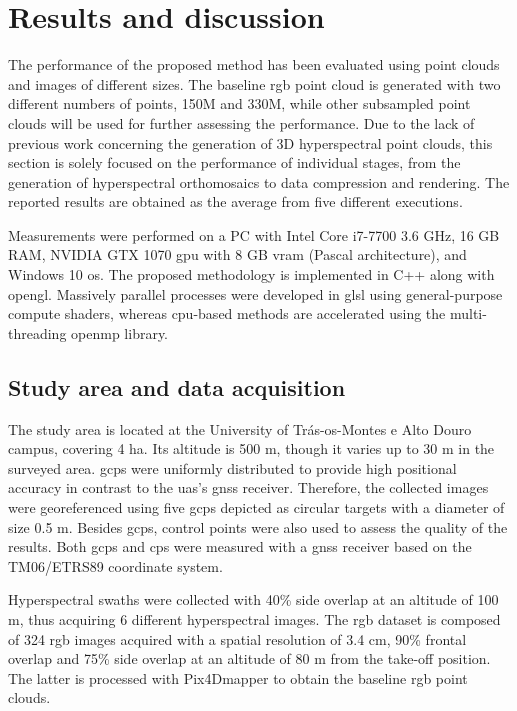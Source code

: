 \section{Results and discussion}

The performance of the proposed method has been evaluated using point clouds and images of different sizes. The baseline \acrshort{rgb} point cloud is generated with two different numbers of points, 150M and 330M, while other subsampled point clouds will be used for further assessing the performance. Due to the lack of previous work concerning the generation of 3D hyperspectral point clouds, this section is solely focused on the performance of individual stages, from the generation of hyperspectral orthomosaics to data compression and rendering. The reported results are obtained as the average from five different executions.

Measurements were performed on a PC with Intel Core i7-7700 3.6 GHz, 16 GB RAM, NVIDIA GTX 1070 \acrshort{gpu} with 8 GB \acrshort{vram} (Pascal architecture), and Windows 10 \acrshort{os}. The proposed methodology is implemented in C++ along with \acrshort{opengl}. Massively parallel processes were developed in \acrshort{glsl} using general-purpose compute shaders, whereas \acrshort{cpu}-based methods are accelerated using the multi-threading \acrshort{openmp} library.

\subsection{Study area and data acquisition}

The study area is located at the University of Trás-os-Montes e Alto Douro campus, covering 4 \si{\hectare}. Its altitude is 500 \si{\meter}, though it varies up to 30 \si{\meter} in the surveyed area. \acrshort{gcp}s were uniformly distributed to provide high positional accuracy in contrast to the \acrshort{uas}’s \acrshort{gnss} receiver. Therefore, the collected images were georeferenced using five \acrshort{gcp}s depicted as circular targets with a diameter of size 0.5 \si{\meter}. Besides \acrshort{gcp}s, control points were also used to assess the quality of the results. Both \acrshort{gcp}s and \acrshort{cp}s were measured with a \acrshort{gnss} receiver based on the TM06/ETRS89 coordinate system.

Hyperspectral swaths were collected with 40\% side overlap at an altitude of 100 \si{\meter}, thus acquiring 6 different hyperspectral images. The \acrshort{rgb} dataset is composed of 324 \acrshort{rgb} images acquired with a spatial resolution of 3.4 \si{\centi\meter}, 90\% frontal overlap and 75\% side overlap at an altitude of 80 \si{\meter} from the take-off position. The latter is processed with Pix4Dmapper to obtain the baseline \acrshort{rgb} point clouds. 

